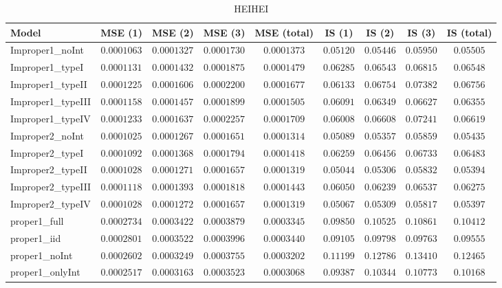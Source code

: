 \begin{table}

\caption{\label{tab:model-choice-sc5}HEIHEI}
\centering
\begin{tabular}{lcccccccc}
\hline
Model  & MSE (1) & MSE (2) & MSE (3) & MSE (total) & IS (1) & IS (2) & IS (3) & \multicolumn{1}{c}{IS (total)} \\ 
\hline
Improper1_noInt  & $0.0001063$ & $0.0001327$ & $0.0001730$ & $0.0001373$ & $0.05120$ & $0.05446$ & $0.05950$ & $0.05505$ \\
Improper1_typeI  & $0.0001131$ & $0.0001432$ & $0.0001875$ & $0.0001479$ & $0.06285$ & $0.06543$ & $0.06815$ & $0.06548$ \\
Improper1_typeII  & $0.0001225$ & $0.0001606$ & $0.0002200$ & $0.0001677$ & $0.06133$ & $0.06754$ & $0.07382$ & $0.06756$ \\
Improper1_typeIII  & $0.0001158$ & $0.0001457$ & $0.0001899$ & $0.0001505$ & $0.06091$ & $0.06349$ & $0.06627$ & $0.06355$ \\
Improper1_typeIV  & $0.0001233$ & $0.0001637$ & $0.0002257$ & $0.0001709$ & $0.06008$ & $0.06608$ & $0.07241$ & $0.06619$ \\
Improper2_noInt  & $0.0001025$ & $0.0001267$ & $0.0001651$ & $0.0001314$ & $0.05089$ & $0.05357$ & $0.05859$ & $0.05435$ \\
Improper2_typeI  & $0.0001092$ & $0.0001368$ & $0.0001794$ & $0.0001418$ & $0.06259$ & $0.06456$ & $0.06733$ & $0.06483$ \\
Improper2_typeII  & $0.0001028$ & $0.0001271$ & $0.0001657$ & $0.0001319$ & $0.05044$ & $0.05306$ & $0.05832$ & $0.05394$ \\
Improper2_typeIII  & $0.0001118$ & $0.0001393$ & $0.0001818$ & $0.0001443$ & $0.06050$ & $0.06239$ & $0.06537$ & $0.06275$ \\
Improper2_typeIV  & $0.0001028$ & $0.0001272$ & $0.0001657$ & $0.0001319$ & $0.05067$ & $0.05309$ & $0.05817$ & $0.05397$ \\
proper1_full  & $0.0002734$ & $0.0003422$ & $0.0003879$ & $0.0003345$ & $0.09850$ & $0.10525$ & $0.10861$ & $0.10412$ \\
proper1_iid  & $0.0002801$ & $0.0003522$ & $0.0003996$ & $0.0003440$ & $0.09105$ & $0.09798$ & $0.09763$ & $0.09555$ \\
proper1_noInt  & $0.0002602$ & $0.0003249$ & $0.0003755$ & $0.0003202$ & $0.11199$ & $0.12786$ & $0.13410$ & $0.12465$ \\
proper1_onlyInt  & $0.0002517$ & $0.0003163$ & $0.0003523$ & $0.0003068$ & $0.09387$ & $0.10344$ & $0.10773$ & $0.10168$ \\

\end{tabular}
\end{table}
